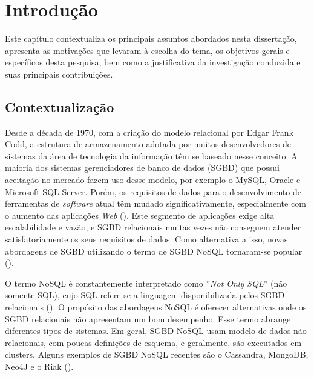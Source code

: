 
\chapter{Introdução}
\label{chp:introduction}


\noindent Este capítulo contextualiza os principais assuntos abordados nesta dissertação, apresenta as motivações que levaram à escolha do tema, os objetivos gerais e específicos desta pesquisa, bem como a justificativa da investigação conduzida e suas principais contribuições.
\clearpage


\section{Contextualização}

Desde a década de 1970, com a criação do modelo relacional por Edgar Frank Codd, a estrutura de armazenamento adotada por muitos desenvolvedores de sistemas da área de tecnologia da informação têm se baseado nesse conceito. A maioria dos sistemas gerenciadores de banco de dados (SGBD) que possui aceitação no mercado fazem uso desse modelo, por exemplo o MySQL, Oracle e Microsoft SQL Server. Porém, os requisitos de dados para o desenvolvimento de ferramentas de \textit{software} atual têm mudado significativamente, especialmente com o aumento das aplicações \textit{Web} (\cite{nasholm:2012}). Este segmento de aplicações exige alta escalabilidade e vazão, e SGBD relacionais muitas vezes não conseguem atender satisfatoriamente os seus requisitos de dados. Como alternativa a isso, novas abordagens de SGBD utilizando o termo de SGBD NoSQL tornaram-se popular (\cite{silva:2016}).

O termo NoSQL é constantemente interpretado como ''\emph{Not Only SQL}'' (não somente SQL), cujo SQL refere-se a linguagem disponibilizada pelos SGBD relacionais (\cite{nasholm:2012}). O propósito das abordagens NoSQL é oferecer alternativas onde os SGBD relacionais não apresentam um bom desempenho. Esse termo abrange diferentes tipos de sistemas. Em geral, SGBD NoSQL usam modelo de dados não-relacionais, com poucas definições de esquema, e geralmente, são executados em clusters. Alguns exemplos de SGBD NoSQL recentes são o Cassandra, MongoDB, Neo4J e o Riak (\cite{fowler:2013}).


